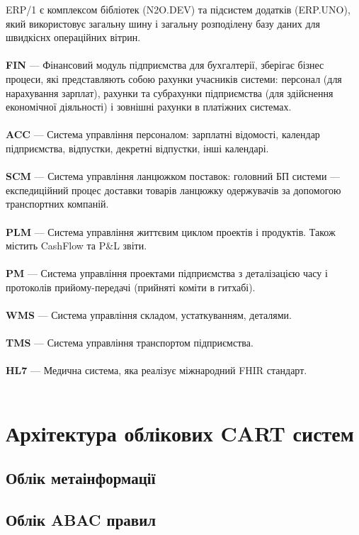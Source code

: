 ERP/1 є комплексом бібліотек (N2O.DEV) та підсистем додатків (ERP.UNO),
який використовує загальну шину і загальну розподілену базу даних для швидкіснх операційних вітрин.
\\
\\
\textbf{FIN} — Фінансовий модуль підприємства для бухгалтерії, зберігає бізнес процеси,
        які представляють собою рахунки учасників системи: персонал (для нарахування зарплат),
        рахунки та субрахунки підприємства (для здійснення економічної діяльності) і
        зовнішні рахунки в платіжних системах.
\\
\\
\textbf{ACC} — Система управління персоналом: зарплатні відомості,
        календар підприємства, відпустки, декретні відпустки, інші календарі.
\\
\\
\textbf{SCM} — Система управління ланцюжком поставок: головний БП системи —
           експедиційний процес доставки товарів ланцюжку одержувачів
           за допомогою транспортних компаній.
\\
\\
\textbf{PLM} — Система управління життєвим циклом проектів і продуктів.
           Також містить CashFlow та P\&L звіти.
\\
\\
\textbf{PM} — Система управління проектами підприємства з деталізацією
           часу і протоколів прийому-передачі (прийняті коміти в гитхабі).
\\
\\
\textbf{WMS} — Система управління складом, устаткуванням, деталями.
\\
\\
\textbf{TMS} — Система управління транспортом підприємства.
\\
\\
\textbf{HL7} — Медична система, яка реалізує міжнародний FHIR стандарт.
\\
\\
\newpage
\section{Архітектура облікових CART систем}

\subsection{Облік метаінформації}

\subsection{Облік ABAC правил}

